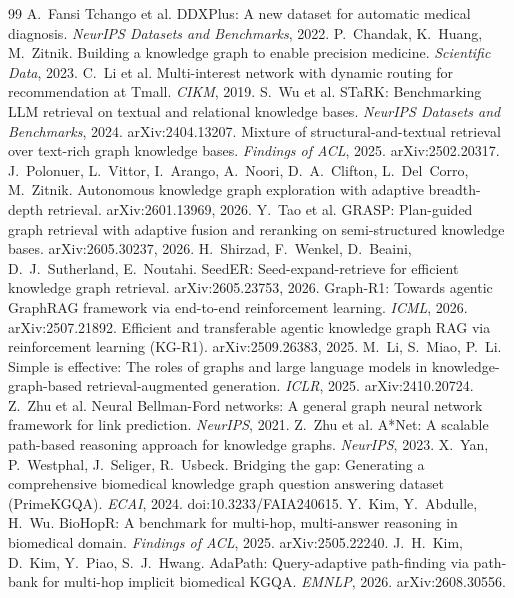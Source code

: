 \documentclass[11pt,a4paper]{article}
\theoremstyle{remark}
\begin{document}
\begin{thebibliography}{99}
\small
{} A.~Fansi Tchango et al. DDXPlus: A new dataset for automatic medical diagnosis. \emph{NeurIPS Datasets and Benchmarks}, 2022.
 P.~Chandak, K.~Huang, M.~Zitnik. Building a knowledge graph to enable precision medicine. \emph{Scientific Data}, 2023.
 C.~Li et al. Multi-interest network with dynamic routing for recommendation at Tmall. \emph{CIKM}, 2019.
 S.~Wu et al. STaRK: Benchmarking LLM retrieval on textual and relational knowledge bases. \emph{NeurIPS Datasets and Benchmarks}, 2024. arXiv:2404.13207.
 Mixture of structural-and-textual retrieval over text-rich graph knowledge bases. \emph{Findings of ACL}, 2025. arXiv:2502.20317.
 J.~Polonuer, L.~Vittor, I.~Arango, A.~Noori, D.~A.~Clifton, L.~Del~Corro, M.~Zitnik. Autonomous knowledge graph exploration with adaptive breadth-depth retrieval. arXiv:2601.13969, 2026.
 Y.~Tao et al. GRASP: Plan-guided graph retrieval with adaptive fusion and reranking on semi-structured knowledge bases. arXiv:2605.30237, 2026.
 H.~Shirzad, F.~Wenkel, D.~Beaini, D.~J.~Sutherland, E.~Noutahi. SeedER: Seed-expand-retrieve for efficient knowledge graph retrieval. arXiv:2605.23753, 2026.
 Graph-R1: Towards agentic GraphRAG framework via end-to-end reinforcement learning. \emph{ICML}, 2026. arXiv:2507.21892.
 Efficient and transferable agentic knowledge graph RAG via reinforcement learning (KG-R1). arXiv:2509.26383, 2025.
 M.~Li, S.~Miao, P.~Li. Simple is effective: The roles of graphs and large language models in knowledge-graph-based retrieval-augmented generation. \emph{ICLR}, 2025. arXiv:2410.20724.
 Z.~Zhu et al. Neural Bellman-Ford networks: A general graph neural network framework for link prediction. \emph{NeurIPS}, 2021.
 Z.~Zhu et al. A*Net: A scalable path-based reasoning approach for knowledge graphs. \emph{NeurIPS}, 2023.
 X.~Yan, P.~Westphal, J.~Seliger, R.~Usbeck. Bridging the gap: Generating a comprehensive biomedical knowledge graph question answering dataset (PrimeKGQA). \emph{ECAI}, 2024. doi:10.3233/FAIA240615.
 Y.~Kim, Y.~Abdulle, H.~Wu. BioHopR: A benchmark for multi-hop, multi-answer reasoning in biomedical domain. \emph{Findings of ACL}, 2025. arXiv:2505.22240.
 J.~H.~Kim, D.~Kim, Y.~Piao, S.~J.~Hwang. AdaPath: Query-adaptive path-finding via path-bank for multi-hop implicit biomedical KGQA. \emph{EMNLP}, 2026. arXiv:2608.30556.

\end{thebibliography}
\end{document}
